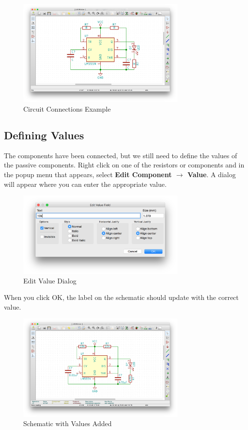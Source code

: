 \documentclass[12pt, oneside]{article}
\begin{document}
\begin{figure}[H]
\includegraphics[width=0.75\textwidth]{SchematicConnections}
\centering
\caption{Circuit Connections Example}
\end{figure}

\subsection{Defining Values}
The components have been connected, but we still need to define the values of the passive components. Right click on one of the resistors or components and in the popup menu that appears, select \textbf{Edit Component $\rightarrow$ Value}. A dialog will appear where you can enter the appropriate value. 

\begin{figure}[H]
\includegraphics[width=0.75\textwidth]{EditValue}
\centering
\caption{Edit Value Dialog}
\end{figure}

When you click OK, the label on the schematic should update with the correct value.

\begin{figure}[H]
\includegraphics[width=0.75\textwidth]{AddedValues}
\centering
\caption{Schematic with Values Added}
\end{figure}
\end{document}
